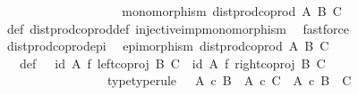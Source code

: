 \begin{isabellebody}
\ \ \ \ \ \ \isamarkupfalse%
\isanewline
\ \ \ \ \isamarkupfalse%
\isanewline
\ \ \isamarkupfalse%
\isanewline
\ \ \isamarkupfalse%
\ \isamarkupfalse%
\ {\isachardoublequoteopen}monomorphism\ {\isacharparenleft}{\kern0pt}dist{\isacharunderscore}{\kern0pt}prod{\isacharunderscore}{\kern0pt}coprod\ A\ B\ C{\isacharparenright}{\kern0pt}{\isachardoublequoteclose}\isanewline
\ \ \ \ \isamarkupfalse%
\ {\isasymphi}{\isacharunderscore}{\kern0pt}def\ dist{\isacharunderscore}{\kern0pt}prod{\isacharunderscore}{\kern0pt}coprod{\isacharunderscore}{\kern0pt}def\ injective{\isacharunderscore}{\kern0pt}imp{\isacharunderscore}{\kern0pt}monomorphism\ \isamarkupfalse%
\ fastforce\isanewline
{}\isamarkupfalse%
%
\endisatagproof
{\isafoldproof}%
%
\isadelimproof
\isanewline
%
\endisadelimproof
\isanewline
{}\isamarkupfalse%
\ dist{\isacharunderscore}{\kern0pt}prod{\isacharunderscore}{\kern0pt}coprod{\isacharunderscore}{\kern0pt}epi{\isacharcolon}{\kern0pt}\isanewline
\ \ {\isachardoublequoteopen}epimorphism\ {\isacharparenleft}{\kern0pt}dist{\isacharunderscore}{\kern0pt}prod{\isacharunderscore}{\kern0pt}coprod\ A\ B\ C{\isacharparenright}{\kern0pt}{\isachardoublequoteclose}\isanewline
%
\isadelimproof
%
\endisadelimproof
%
\isatagproof
{}\isamarkupfalse%
\ {\isacharminus}{\kern0pt}\isanewline
\ \ \isamarkupfalse%
\ {\isasymphi}\ \ {\isasymphi}{\isacharunderscore}{\kern0pt}def{\isacharcolon}{\kern0pt}\ {\isachardoublequoteopen}{\isasymphi}\ {\isacharequal}{\kern0pt}\ {\isacharparenleft}{\kern0pt}id\ A\ {\isasymtimes}\isactrlsub f\ left{\isacharunderscore}{\kern0pt}coproj\ B\ C{\isacharparenright}{\kern0pt}\ {\isasymamalg}\ {\isacharparenleft}{\kern0pt}id\ A\ {\isasymtimes}\isactrlsub f\ right{\isacharunderscore}{\kern0pt}coproj\ B\ C{\isacharparenright}{\kern0pt}{\isachardoublequoteclose}\ \isanewline
\ \ \ \ \ \ \ \ \ \ \ \ \ \ \ \ \ {\isasymphi}{\isacharunderscore}{\kern0pt}type{\isacharbrackleft}{\kern0pt}type{\isacharunderscore}{\kern0pt}rule{\isacharbrackright}{\kern0pt}{\isacharcolon}{\kern0pt}\ {\isachardoublequoteopen}{\isasymphi}\ {\isacharcolon}{\kern0pt}\ {\isacharparenleft}{\kern0pt}A\ {\isasymtimes}\isactrlsub c\ B{\isacharparenright}{\kern0pt}\ {\isasymCoprod}\ {\isacharparenleft}{\kern0pt}A\ {\isasymtimes}\isactrlsub c\ C{\isacharparenright}{\kern0pt}\ {\isasymrightarrow}\ A\ {\isasymtimes}\isactrlsub c\ {\isacharparenleft}{\kern0pt}B\ {\isasymCoprod}\ C{\isacharparenright}{\kern0pt}{\isachardoublequoteclose}\isanewline

\end{isabellebody}
